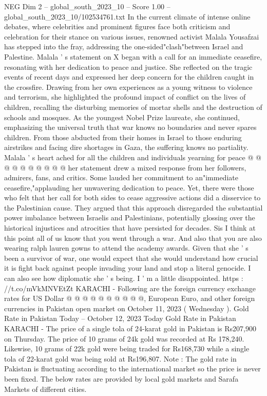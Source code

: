 \begin{textsample}{NEG Dim 2 – global\_south\_2023\_10 – Score 1.00 – global\_south\_2023\_10/102534761.txt}  \label{ex:f2_neg_384}
In the current climate of intense online debates, where celebrities and prominent figures face both criticism and celebration for their stance on various issues, renowned activist Malala Yousafzai has stepped into the fray, addressing the one-sided"clash"between Israel and Palestine.
Malala ' s statement on X began with a call for an immediate ceasefire, resonating with her dedication to peace and justice.
She reflected on the tragic events of recent days and expressed her deep concern for the children caught in the crossfire.
Drawing from her own experiences as a young witness to violence and terrorism, she highlighted the profound impact of conflict on the lives of children, recalling the disturbing memories of mortar shells and the destruction of schools and mosques.
As the youngest Nobel Prize laureate, she continued, emphasizing the universal truth that war knows no boundaries and never spares children.
From those abducted from their homes in Israel to those enduring airstrikes and facing dire shortages in Gaza, the suffering knows no partiality.
Malala ' s heart ached for all the children and individuals yearning for peace @ @ @ @ @ @ @ @ @ @ her statement drew a mixed response from her followers, admirers, fans, and critics.
Some lauded her commitment to an"immediate ceasefire,"applauding her unwavering dedication to peace.
Yet, there were those who felt that her call for both sides to cease aggressive actions did a disservice to the Palestinian cause.
They argued that this approach disregarded the substantial power imbalance between Israelis and Palestinians, potentially glossing over the historical injustices and atrocities that have persisted for decades.
Sis I think at this point all of us know that you went through a war.
And also that you are also wearing ralph lauren gowns to attend the academy awards.
Given that she ' s been a survivor of war, one would expect that she would understand how crucial it is fight back against people invading your land and stop a literal genocide.
I can also see how diplomatic she ' s being.
I ' m a little disappointed. https : //t.co/mVkMNVEtZt KARACHI - Following are the foreign currency exchange rates for US Dollar @ @ @ @ @ @ @ @ @ @, European Euro, and other foreign currencies in Pakistan open market on October 11, 2023 ( Wednesday ).
Gold Rate in Pakistan Today -- October 12, 2023 Today Gold Rate in Pakistan KARACHI - The price of a single tola of 24-karat gold in Pakistan is Rs207,900 on Thursday.
The price of 10 grams of 24k gold was recorded at Rs 178,240.
Likewise, 10 grams of 22k gold were being traded for Rs168,730 while a single tola of 22-karat gold was being sold at Rs196,807.
Note : The gold rate in Pakistan is fluctuating according to the international market so the price is never been fixed.
The below rates are provided by local gold markets and Sarafa Markets of different cities.

\end{textsample}
